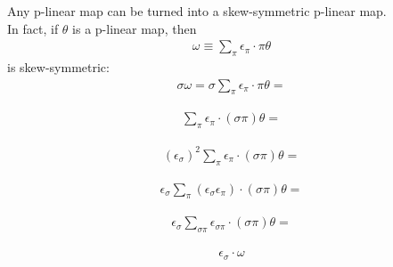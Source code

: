\documentclass[12pt,a4paper]{article}
\begin{document}
\hspace{1cm} Any p-linear map can be turned into a skew-symmetric p-linear map.\\ In
fact, if $\theta$ is a p-linear map, then
\begin{align*}
\omega \equiv \sum_\pi \epsilon_\pi \cdot \pi \theta
\end{align*}
is skew-symmetric:
\begin{align*}
\sigma \omega = \sigma \sum_\pi \epsilon_\pi \cdot \pi \theta =
\end{align*}

\begin{align*}
 \sum_\pi \epsilon_\pi \cdot (\sigma \pi) \theta =
\end{align*}

\begin{align*}
(\epsilon_\sigma)^2 \sum_\pi \epsilon_\pi \cdot (\sigma \pi)\theta =
\end{align*}

\begin{align*}
\epsilon_\sigma \sum_\pi (\epsilon_\sigma \epsilon_\pi) \cdot (\sigma \pi)\theta =
\end{align*}

\begin{align*}
\epsilon_\sigma \sum_{\sigma \pi} \epsilon_{\sigma \pi} \cdot (\sigma \pi) \theta =
\end{align*}

\begin{align*}
\epsilon_\sigma \cdot \omega
\end{align*}
\end{document}
